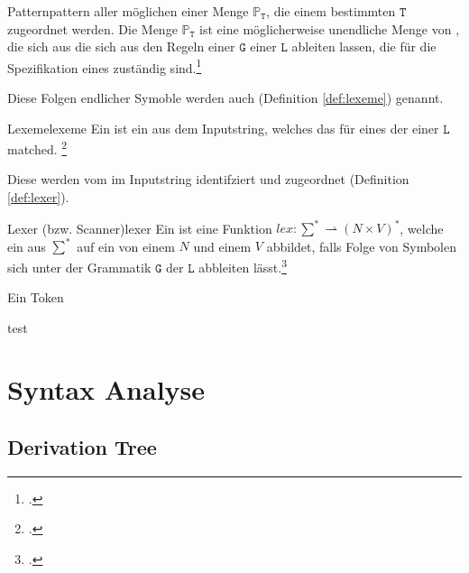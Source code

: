 \begin{Definition}{Pattern}{pattern}
   aller möglichen  einer Menge $\mathbb{P}_\mathtt{T}$, die einem bestimmten  $\mathtt{T}$ zugeordnet werden.
  Die Menge $\mathbb{P}_\mathtt{T}$ ist eine möglicherweise unendliche Menge von , die sich aus die sich aus den Regeln einer  $\mathtt{G}$ einer  $\mathtt{L}$ ableiten lassen, die für die Spezifikation eines   zuständig sind.\footcite{noauthor_what_nodate}
\end{Definition}

Diese Folgen endlicher Symoble werden auch  (Definition \ref{def:lexeme}) genannt.

\begin{Definition}{Lexeme}{lexeme}
  Ein  ist ein  aus dem Inputstring, welches das  für eines der  einer  $\mathtt{L}$ matched.
\footcite{noauthor_what_nodate}
\end{Definition}

Diese  werden vom  im Inputstring identifziert und  zugeordnet (Definition \ref{def:lexer}).

\begin{Definition}{Lexer (bzw. Scanner)}{lexer}
  Ein  ist eine  Funktion \hspace{0.2cm}$lex: \sum^{*} \rightharpoonup (N \times V)^{*}$, welche ein  aus $\sum^{*}$ auf ein  von einem  $N$ und einem   $V$ abbildet, falls Folge von Symbolen sich unter der Grammatik $\mathtt{G}$ der  $\mathtt{L}$ abbleiten lässt.\footcite{noauthor_lecture-notes-2021_2022}
\end{Definition}

Ein Token

\begin{special_paragraph}
  test
\end{special_paragraph}

\section{Syntax Analyse}
\subsection{Derivation Tree}
